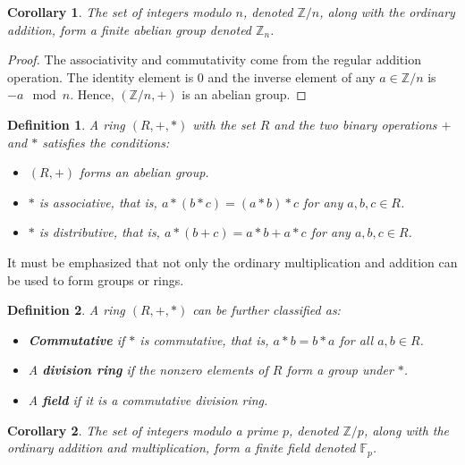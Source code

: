 \documentclass{ufsctex/ufsctex}
\newtheorem{definition}{Definition}
\newtheorem{corollary}{Corollary}
\begin{document}
\begin{corollary}
The set of integers modulo $n$, denoted $\mathbb{Z}/n$, along with the ordinary
addition, form a finite abelian group denoted $\mathbb{Z}_n$.
\end{corollary}

\begin{proof}
The associativity and commutativity come from the regular addition operation.
The identity element is $0$ and the inverse element of any $a \in \mathbb{Z}/n$
is $-a \mod n$. Hence, $(\mathbb{Z}/n, +)$ is an abelian group.
\end{proof}

\begin{definition}
A ring $(R, +, *)$ with the set $R$ and the two binary operations $+$ and $*$
satisfies the conditions:
\begin{itemize}
	\item $(R, +)$ forms an abelian group.
	\item $*$ is associative, that is, $a*(b*c) = (a*b)*c$ for any $a, b, c \in
	R$.
	\item $*$ is distributive, that is, $a*(b+c) = a*b + a*c$ for any $a, b, c
	\in R$.
\end{itemize}
\end{definition}

It must be emphasized that not only the ordinary multiplication and addition
can be used to form groups or rings.

\begin{definition}
A ring $(R, +, *)$ can be further classified as:
\begin{itemize}
	\item \textbf{Commutative} if $*$ is commutative, that is, $a*b = b*a$ for
	all $a, b \in R$.
	\item A \textbf{division ring} if the nonzero elements of $R$ form a group
	under $*$.
	\item A \textbf{field} if it is a commutative division ring.
\end{itemize}
\end{definition}

\begin{corollary}
The set of integers modulo a prime $p$, denoted $\mathbb{Z}/p$, along with the
ordinary addition and multiplication, form a finite field denoted
$\mathbb{F}_p$.
\end{corollary}
\end{document}
